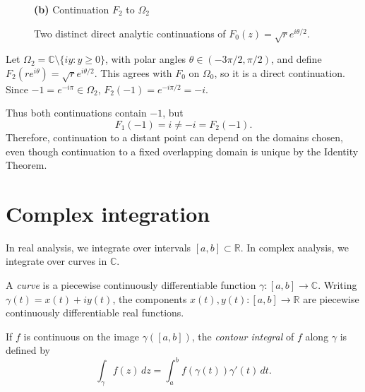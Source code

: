 \begin{example}
\begin{figure}[b]
\begin{minipage}[t]{0.48\textwidth}
            \par\vspace{0.4em}
            {\footnotesize \textbf{(b)} Continuation \(F_2\) to \(\Omega_2\)}
        \end{minipage}
        \caption{Two distinct direct analytic continuations of \(F_0(z) = \sqrt{r}e^{i\theta/2}\).}
    \end{figure}

    Let \(\Omega_2 = \mathbb{C} \setminus \{ iy : y \ge 0 \}\), with polar angles \(\theta \in (-3\pi/2, \pi/2)\), and define
    \( F_2(r e^{i\theta}) = \sqrt{r}e^{i\theta/2} \).
    This agrees with \(F_0\) on \(\Omega_0\), so it is a direct continuation. Since \(-1=e^{-i\pi}\in\Omega_2\),
    \( F_2(-1) = e^{-i\pi/2} = -i \).

    Thus both continuations contain \(-1\), but
    \[
        F_1(-1) = i \neq -i = F_2(-1).
    \]
    Therefore, continuation to a distant point can depend on the domains chosen, even though continuation to a fixed overlapping domain is unique by the Identity Theorem.
\end{example}


\section*{Complex integration}

In real analysis, we integrate over intervals \([a, b] \subset \mathbb{R}\).
In complex analysis, we integrate over curves in \(\mathbb{C}\).

A \emph{curve} is a piecewise continuously differentiable function \(\gamma \colon [a, b] \to \mathbb{C}\).
Writing \(\gamma(t) = x(t) + i y(t)\), the components \(x(t), y(t) \colon [a, b] \to \mathbb{R}\) are piecewise continuously differentiable real functions.

\begin{definition}
If \(f\) is continuous on the image \(\gamma([a, b])\), the \emph{contour integral} of \(f\) along \(\gamma\) is defined by
\[
    \int_\gamma f(z) \, dz = \int_a^b f(\gamma(t)) \gamma'(t) \, dt.
\]
\end{definition}

